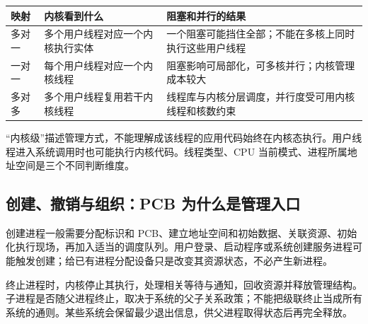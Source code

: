 \begin{wideblock}

\par\medskip\noindent\begin{minipage}{\linewidth}\fontsize{9.3}{12}\selectfont\begin{tabularx}{\linewidth}{@{}YYY@{}}
\toprule\noalign{}
\begin{minipage}[b]{\linewidth}\raggedright
映射
\end{minipage} & \begin{minipage}[b]{\linewidth}\raggedright
内核看到什么
\end{minipage} & \begin{minipage}[b]{\linewidth}\raggedright
阻塞和并行的结果
\end{minipage} \\
\midrule\noalign{}


多对一 & 多个用户线程对应一个内核执行实体 & 一个阻塞可能挡住全部；不能在多核上同时执行这些用户线程 \\
一对一 & 每个用户线程对应一个内核线程 & 阻塞影响可局部化，可多核并行；内核管理成本较大 \\
多对多 & 多个用户线程复用若干内核线程 & 线程库与内核分层调度，并行度受可用内核线程和核数约束 \\
\bottomrule\end{tabularx}
\end{minipage}\par\medskip

\end{wideblock}

``内核级''描述管理方式，不能理解成该线程的应用代码始终在内核态执行。用户线程进入系统调用时也可能执行内核代码。线程类型、CPU 当前模式、进程所属地址空间是三个不同判断维度。

\subsection{创建、撤销与组织：PCB 为什么是管理入口}\label{OS02-2-4}

创建进程一般需要分配标识和 PCB、建立地址空间和初始数据、关联资源、初始化执行现场，再加入适当的调度队列。用户登录、启动程序或系统创建服务进程可能触发创建；给已有进程分配设备只是改变其资源状态，不必产生新进程。

终止进程时，内核停止其执行，处理相关等待与通知，回收资源并释放管理结构。子进程是否随父进程终止，取决于系统的父子关系政策；不能把级联终止当成所有系统的通则。某些系统会保留最少退出信息，供父进程取得状态后再完全释放。


